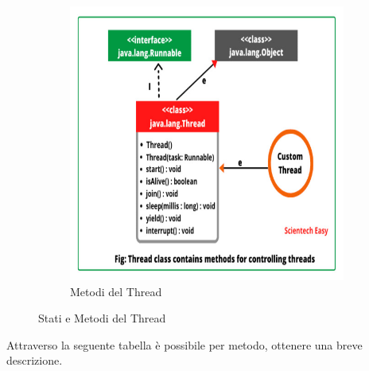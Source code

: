 \begin{figure}[ht]
\begin{subfigure}{0.5\textwidth}
		\includegraphics[width=1.0\textwidth]{Immagini/image_thread2.jpg}
		\caption{Metodi del Thread}
	\end{subfigure}
	\caption{Stati e Metodi del Thread}
	\label{fig:one}
\end{figure}
%
\newline
%
Attraverso la seguente tabella è possibile per metodo, ottenere una breve descrizione. 
\newline
